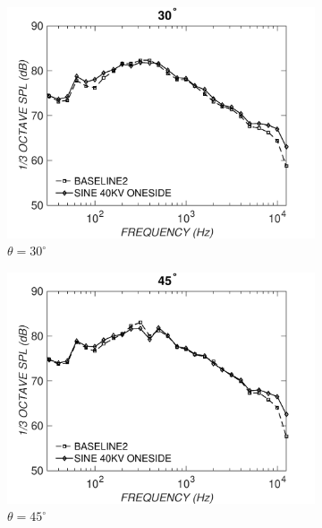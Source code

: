\begin{figure}
\centering
\begin{subfigure}{0.32\textwidth}
\includegraphics[width=\linewidth]{figures/octave302}
\caption{$\theta=30^\circ$}
\label{fig:octave302}
\end{subfigure}%
\hspace*{\fill} %
\begin{subfigure}{0.32\textwidth}
\includegraphics[width=\linewidth]{figures/octave452}
\caption{$\theta=45^\circ$}
\label{fig:octave452}
\end{subfigure}%
\hspace*{\fill} %
\begin{subfigure}{0.32\textwidth}

\end{subfigure}
\end{figure}

